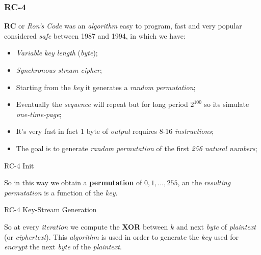 \documentclass{article}
\begin{document}
\subsubsection{RC-4}
\textbf{RC} or \emph{Ron's Code} was an \emph{algorithm} easy to program, fast and very popular considered \emph{safe} between 1987 and 1994, in which we have:
\begin{itemize}
\item \emph{Variable key length} (\emph{byte});
\item \emph{Synchronous stream cipher};
\item Starting from the \emph{key} it generates a \emph{random permutation};
\item Eventually the \emph{sequence} will repeat but for long period $2^100$ so its simulate \emph{one-time-page};
\item It's very fast in fact 1 byte of \emph{output} requires 8-16 \emph{instructions};
\item The goal is to generate \emph{random permutation} of the first \emph{256 natural numbers};
\end{itemize}
\begin{algorithm}[H]
\renewcommand{\thealgorithm}{}
\caption{RC-4 Init}
\end{algorithm}
So in this way we obtain a \textbf{permutation} of $0,1,...,255$, an the \emph{resulting permutation} is a function of the \emph{key}. 
\begin{algorithm}[H]
\renewcommand{\thealgorithm}{}
\caption{RC-4 Key-Stream Generation}
\end{algorithm}
So at every \emph{iteration} we compute the \textbf{XOR} between $k$ and next \emph{byte} of \emph{plaintext} (or \emph{ciphertext}). This \emph{algorithm} is used in order to generate the \emph{key} used for \emph{encrypt} the next \emph{byte} of the \emph{plaintext}. 
\end{document}

